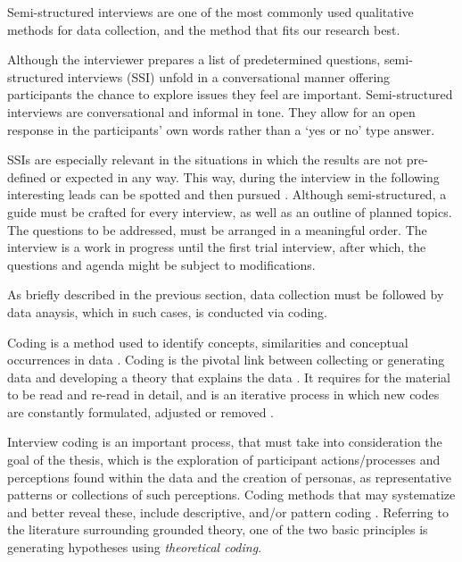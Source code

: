 Semi-structured interviews are one of the most commonly used qualitative methods for data collection, and the method that fits our research best.

Although the interviewer prepares a list of predetermined questions, semi-structured interviews (SSI) unfold in a conversational manner offering participants the chance to explore issues
they feel are important. Semi-structured interviews are conversational and informal in tone. They allow for an open response in the participants’ own words rather than a ‘yes or no’ type answer. 

SSIs are especially relevant in the situations in which the results are not pre-defined or expected in any way. This way, during the interview in the following interesting leads can be spotted and then pursued \cite{Adams2015}. Although semi-structured, a guide must be crafted for every interview, as well as an outline of planned topics. The questions to be addressed, must be arranged in a meaningful order. The interview is a work in progress until the first trial interview, after which, the questions and agenda might be subject to modifications.

As briefly described in the previous section, data collection must be followed by data anaysis, which in such cases, is conducted via coding. 

Coding is a method used to identify concepts, similarities and conceptual occurrences in data . Coding is the pivotal link between collecting or generating data and developing a theory that explains the data \cite{Charmaz2012}. It requires for the material to be read and re-read in detail, and is an iterative process in which new codes are constantly formulated, adjusted or removed \cite{Runeson2012}. 

Interview coding is an important process, that must take into consideration the goal of the thesis, which is the exploration of participant actions/processes and perceptions found within the data and the creation of personas, as representative patterns or collections of such perceptions. Coding methods that may systematize and better reveal these, include descriptive, and/or pattern coding \cite{Wicks2017}. Referring to the literature surrounding grounded theory, one of the two basic principles is generating hypotheses using \textit{theoretical coding}. 


